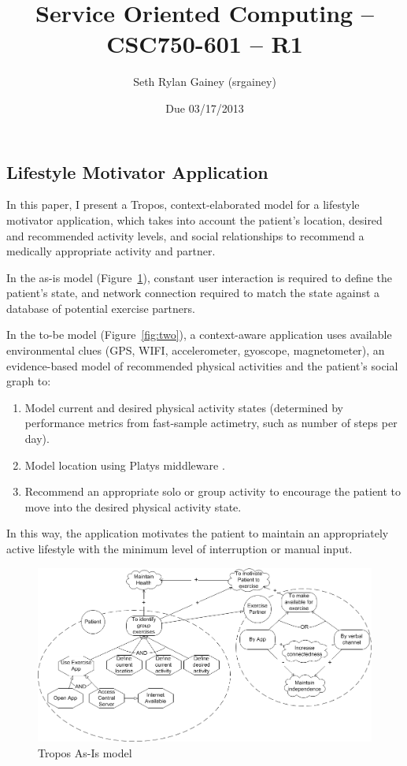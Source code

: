 \documentclass[9pt,letterpaper]{article}
\title{Service Oriented Computing -- CSC750-601 -- R1}
\author{Seth Rylan Gainey (srgainey)}
\date{Due 03/17/2013}
\begin{document}


\maketitle{}


\subsection*{Lifestyle Motivator Application}


In this paper, I present a Tropos\cite{website:tropos}, context-elaborated\cite{pradeep:1} model for a lifestyle motivator application, which takes into account the patient's location, desired and recommended activity levels, and social relationships to recommend a medically appropriate activity and partner.

In the as-is model (Figure~\ref{fig:one}), constant user interaction is required to define the patient's state, and network connection required to match the state against a database of potential exercise partners.

In the to-be model (Figure~\ref{fig:two}), a context-aware application uses available environmental clues (GPS, WIFI, accelerometer, gyoscope, magnetometer), an evidence-based model of recommended physical activities and the patient's social graph to:

\begin{enumerate}
\addtolength{\itemsep}{-0.5\baselineskip}
\item Model current and desired physical activity states (determined by performance metrics from fast-sample actimetry, such as number of steps per day).
\item Model location using Platys middleware \cite{pradeep:2}.
\item Recommend an appropriate solo or group activity to encourage the patient to move into the desired physical activity state.
\end{enumerate}
In this way, the application motivates the patient to maintain an appropriately active lifestyle with the minimum level of interruption or manual input.

\begin{figure}
\centerline{\includegraphics[scale=.51]{soc-r1-srgainey-as-is.png}}
\caption{Tropos As-Is model}
\label{fig:one}
\end{figure}
\end{document}
